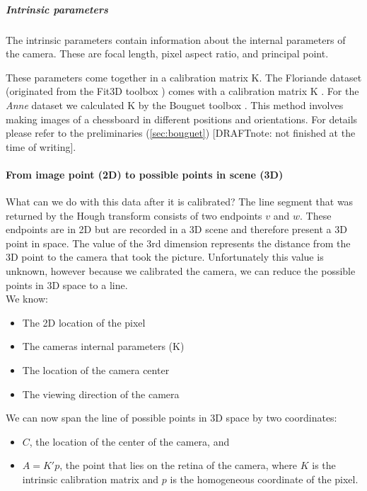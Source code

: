 	\subparagraph{Intrinsic parameters}
	The intrinsic parameters contain information about the internal parameters
	of the camera.  These are focal length, pixel aspect ratio, and principal point.

	These parameters come together in a calibration matrix K.  The Floriande
	dataset (originated from the Fit3D toolbox \cite{Fit3d}) comes with a
	calibration matrix K .  For
	the \emph{Anne} dataset we calculated K by the Bouguet toolbox
	\cite{bouguet}.
	This method involves making images of a chessboard in
	different positions and orientations. For details please refer to the
	preliminaries (\ref{sec:bouguet}) [DRAFTnote: not finished at the
	time of writing].

	 
	\paragraph{From image point (2D) to possible points in scene (3D)} 
	What can we do with this data after it is calibrated?
	The line segment that was returned by the Hough transform consists of two
	endpoints $v$ and $w$. These endpoints are in 2D but are recorded in a 3D
	scene and therefore present a 3D point in space.  The value of the 3rd
	dimension represents the distance from the 3D point to the camera that took
	the picture. Unfortunately this value is unknown, however because we
	calibrated the camera, we can reduce the possible points in 3D space to a
	line.\\

	We know:
	\begin{itemize}
		\item The 2D location of the pixel
		\item The cameras internal parameters (K) 
		\item The location of the camera center
		\item The viewing direction of the camera
	\end{itemize}


	We can now span the line of possible points in 3D space by two coordinates:\\
	\begin{itemize}
		\item $C$, the location of the center of the camera, and
		\item $A = K'p$, the point that lies on the retina of the camera, where
		$K$ is the intrinsic calibration matrix and $p$ is the homogeneous
		coordinate of the pixel.
	\end{itemize}

